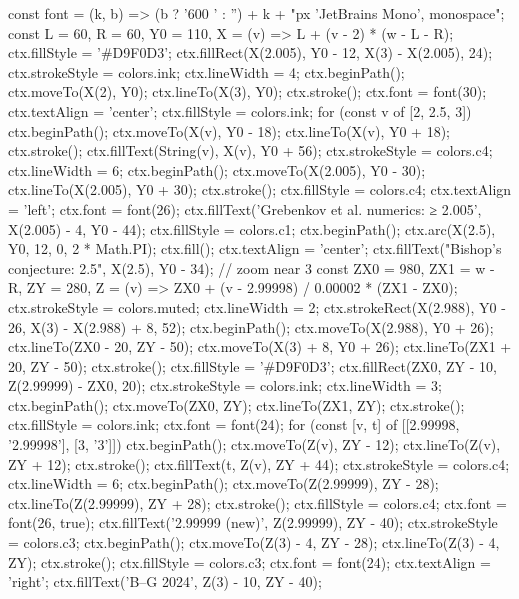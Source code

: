 \begin{js}[size=1700x360, frames=1, alt="Number line from 2 to 3: Grebenkov et al. numerics at 2.005, Bishop's conjecture at 2.5, and a zoom near 3 showing the new bound 2.99999 and the Badger–Genschaw bound just below 3"]
const font = (k, b) => (b ? '600 ' : '') + k + "px 'JetBrains Mono', monospace";
const L = 60, R = 60, Y0 = 110, X = (v) => L + (v - 2) * (w - L - R);
ctx.fillStyle = '#D9F0D3'; ctx.fillRect(X(2.005), Y0 - 12, X(3) - X(2.005), 24);
ctx.strokeStyle = colors.ink; ctx.lineWidth = 4; ctx.beginPath(); ctx.moveTo(X(2), Y0); ctx.lineTo(X(3), Y0); ctx.stroke();
ctx.font = font(30); ctx.textAlign = 'center'; ctx.fillStyle = colors.ink;
for (const v of [2, 2.5, 3]) { ctx.beginPath(); ctx.moveTo(X(v), Y0 - 18); ctx.lineTo(X(v), Y0 + 18); ctx.stroke(); ctx.fillText(String(v), X(v), Y0 + 56); }
ctx.strokeStyle = colors.c4; ctx.lineWidth = 6; ctx.beginPath(); ctx.moveTo(X(2.005), Y0 - 30); ctx.lineTo(X(2.005), Y0 + 30); ctx.stroke();
ctx.fillStyle = colors.c4; ctx.textAlign = 'left'; ctx.font = font(26); ctx.fillText('Grebenkov et al. numerics: ≥ 2.005', X(2.005) - 4, Y0 - 44);
ctx.fillStyle = colors.c1; ctx.beginPath(); ctx.arc(X(2.5), Y0, 12, 0, 2 * Math.PI); ctx.fill();
ctx.textAlign = 'center'; ctx.fillText("Bishop's conjecture: 2.5", X(2.5), Y0 - 34);
// zoom near 3
const ZX0 = 980, ZX1 = w - R, ZY = 280, Z = (v) => ZX0 + (v - 2.99998) / 0.00002 * (ZX1 - ZX0);
ctx.strokeStyle = colors.muted; ctx.lineWidth = 2;
ctx.strokeRect(X(2.988), Y0 - 26, X(3) - X(2.988) + 8, 52);
ctx.beginPath(); ctx.moveTo(X(2.988), Y0 + 26); ctx.lineTo(ZX0 - 20, ZY - 50); ctx.moveTo(X(3) + 8, Y0 + 26); ctx.lineTo(ZX1 + 20, ZY - 50); ctx.stroke();
ctx.fillStyle = '#D9F0D3'; ctx.fillRect(ZX0, ZY - 10, Z(2.99999) - ZX0, 20);
ctx.strokeStyle = colors.ink; ctx.lineWidth = 3; ctx.beginPath(); ctx.moveTo(ZX0, ZY); ctx.lineTo(ZX1, ZY); ctx.stroke();
ctx.fillStyle = colors.ink; ctx.font = font(24);
for (const [v, t] of [[2.99998, '2.99998'], [3, '3']]) { ctx.beginPath(); ctx.moveTo(Z(v), ZY - 12); ctx.lineTo(Z(v), ZY + 12); ctx.stroke(); ctx.fillText(t, Z(v), ZY + 44); }
ctx.strokeStyle = colors.c4; ctx.lineWidth = 6; ctx.beginPath(); ctx.moveTo(Z(2.99999), ZY - 28); ctx.lineTo(Z(2.99999), ZY + 28); ctx.stroke();
ctx.fillStyle = colors.c4; ctx.font = font(26, true); ctx.fillText('2.99999 (new)', Z(2.99999), ZY - 40);
ctx.strokeStyle = colors.c3; ctx.beginPath(); ctx.moveTo(Z(3) - 4, ZY - 28); ctx.lineTo(Z(3) - 4, ZY); ctx.stroke();
ctx.fillStyle = colors.c3; ctx.font = font(24); ctx.textAlign = 'right'; ctx.fillText('B–G 2024', Z(3) - 10, ZY - 40);
\end{js}
